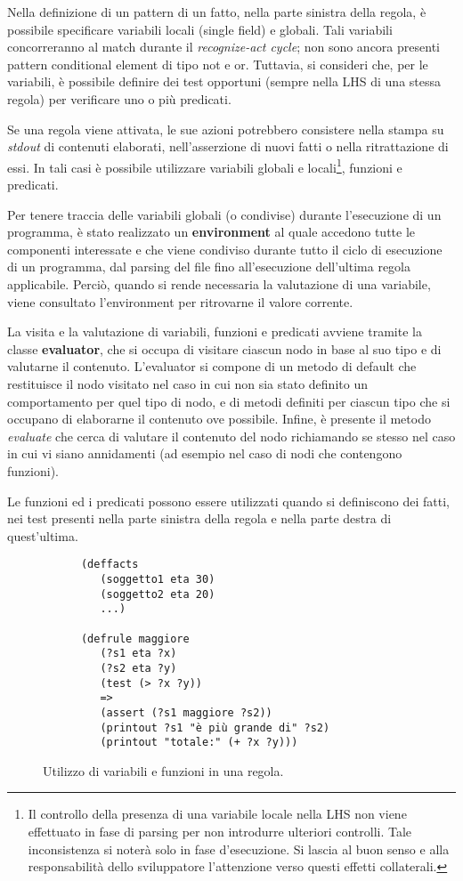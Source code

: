 Nella definizione di un pattern di un fatto, nella parte sinistra della regola, è possibile specificare variabili locali (single field) e globali. Tali variabili concorreranno al match durante il \emph{recognize-act cycle}; non sono ancora presenti pattern conditional element di tipo not e or. Tuttavia, si consideri che, per le variabili, è possibile definire dei test opportuni (sempre nella LHS di una stessa regola) per verificare uno o più predicati.

Se una regola viene attivata, le sue azioni potrebbero consistere nella stampa su \emph{stdout} di contenuti elaborati, nell'asserzione di nuovi fatti o nella ritrattazione di essi. In tali casi è possibile utilizzare variabili globali e locali\footnote{Il controllo della presenza di una variabile locale nella LHS non viene effettuato in fase di parsing per non introdurre ulteriori controlli. Tale inconsistenza si noterà solo in fase d'esecuzione. Si lascia al buon senso e alla responsabilità dello sviluppatore l'attenzione verso questi effetti collaterali.}, funzioni e predicati.

Per tenere traccia delle variabili globali (o condivise) durante l'esecuzione di un programma, è stato realizzato un \textbf{environment} al quale accedono tutte le componenti interessate e che viene condiviso durante tutto il ciclo di esecuzione di un programma, dal parsing del file fino all'esecuzione dell'ultima regola applicabile.
Perciò, quando si rende necessaria la valutazione di una variabile, viene consultato l'environment per ritrovarne il valore corrente.

La visita e la valutazione di variabili, funzioni e predicati avviene tramite la classe \textbf{evaluator}, che si occupa di visitare ciascun nodo in base al suo tipo e di valutarne il contenuto. L'evaluator si compone di un metodo di default che restituisce il nodo visitato nel caso in cui non sia stato definito un comportamento per quel tipo di nodo, e di metodi definiti per ciascun tipo che si occupano di elaborarne il contenuto ove possibile. Infine, è presente il metodo \emph{evaluate} che cerca di valutare il contenuto del nodo richiamando se stesso nel caso in cui vi siano annidamenti (ad esempio nel caso di nodi che contengono funzioni).

Le funzioni ed i predicati possono essere utilizzati quando si definiscono dei fatti, nei test presenti nella parte sinistra della regola e nella parte destra di quest'ultima.

\begin{figure}
\centering
 \begin{verbatim}
      (deffacts
         (soggetto1 eta 30)
         (soggetto2 eta 20)
         ...)

      (defrule maggiore
         (?s1 eta ?x)
         (?s2 eta ?y)
         (test (> ?x ?y))
         =>
         (assert (?s1 maggiore ?s2))
         (printout ?s1 "è più grande di" ?s2)
         (printout "totale:" (+ ?x ?y)))
 \end{verbatim}
 \caption{Utilizzo di variabili e funzioni in una regola.}
\end{figure}

